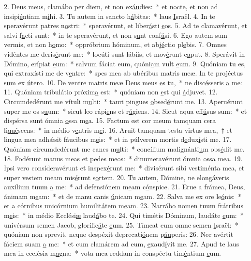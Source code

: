 2. Deus meus, clamábo per diem, et non ex\uline{áu}dies:~* et nocte, et non ad insipi\uline{é}ntiam m\uline{i}hi.
3. Tu autem in sancto h\uline{á}bitas:~* laus \uline{I}sraël.
4. In te speravérunt patres n\uline{o}stri:~* speravérunt, et liber\uline{á}sti \uline{e}os.
5. Ad te clamavérunt, et salvi f\uline{a}cti sunt:~* in te speravérunt, et non s\uline{u}nt conf\uline{ú}si.
6. Ego autem sum vermis, et non h\uline{o}mo:~* oppróbrium hóminum, et abj\uline{é}ctio pl\uline{e}bis.
7. Omnes vidéntes me deris\uline{é}runt me:~* locúti sunt lábiis, et mov\uline{é}runt c\uline{a}put.
8. Sperávit in Dómino, erípiat \uline{e}um:~* salvum fáciat eum, quóni\uline{a}m vult \uline{e}um.
9. Quóniam tu es, qui extraxísti me de v\uline{e}ntre:~* spes mea ab ubéribus matris meæ. In te projéctus s\uline{u}m ex \uline{ú}tero.
10. De ventre matris meæ Deus meus \uline{e}s tu,~* ne disc\uline{é}sseris \uline{a} me:
11. Quóniam tribulátio próxim\uline{a} est:~* quóniam non \uline{e}st qui \uline{á}djuvet.
12. Circumdedérunt me vítuli m\uline{u}lti:~* tauri pingues \uline{o}bsed\uline{é}runt me.
13. Aperuérunt super me os s\uline{u}um:~* sicut leo rápi\uline{e}ns et r\uline{ú}giens.
14. Sicut aqua eff\uline{ú}sus sum:~* et dispérsa sunt ómnia \uline{o}ssa m\uline{e}a.
15. Factum est cor meum tamquam cera li\uline{qué}scens:~* in médio v\uline{e}ntris m\uline{e}i.
16. Aruit tamquam testa virtus mea,~† et lingua mea adhǽsit fáucibus m\uline{e}is:~* et in púlverem mortis d\uline{e}dux\uline{í}sti me.
17. Quóniam circumdedérunt me canes m\uline{u}lti:~* concílium malignánti\uline{u}m obs\uline{é}dit me.
18. Fodérunt manus meas et pedes m\uline{e}os:~* dinumeravérunt ómnia \uline{o}ssa m\uline{e}a.
19. Ipsi vero consíderavérunt et inspex\uline{é}runt me:~* divisérunt sibi vestiménta mea, et super vestem meam mis\uline{é}runt s\uline{o}rtem.
20. Tu autem, Dómine, ne elongáveris auxílium tuum \uline{a} me:~* ad defensiónem m\uline{e}am c\uline{ó}nspice.
21. Erue a frámea, Deus, ánimam m\uline{e}am:~* et de manu canis \uline{ú}nicam m\uline{e}am.
22. Salva me ex ore le\uline{ó}nis:~* et a córnibus unicórnium humilit\uline{á}tem m\uline{e}am.
23. Narrábo nomen tuum frátribus m\uline{e}is:~* in médio Ecclési\uline{æ} laud\uline{á}bo te.
24. Qui timétis Dóminum, laudáte \uline{e}um:~* univérsum semen Jacob, glorific\uline{á}te \uline{e}um.
25. Tímeat eum omne semen \uline{I}sraël:~* quóniam non sprevit, neque despéxit deprecati\uline{ó}nem p\uline{áu}peris:
26. Nec avértit fáciem suam \uline{a} me:~* et cum clamárem ad eum, \uline{e}xaud\uline{í}vit me.
27. Apud te laus mea in ecclésia m\uline{a}gna:~* vota mea reddam in conspéctu tim\uline{é}ntium \uline{e}um.
